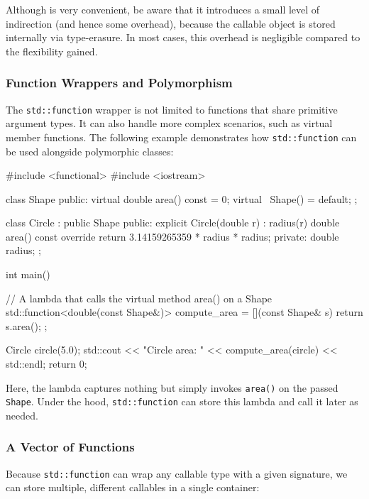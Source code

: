 \begin{warningblock}
Although  is very convenient, be aware that it introduces a small level of indirection (and hence some overhead), because the callable object is stored internally via type-erasure. In most cases, this overhead is negligible compared to the flexibility gained.
\end{warningblock}

\subsubsection{Function Wrappers and Polymorphism}
The \texttt{std::function} wrapper is not limited to functions that share primitive argument types. It can also handle more complex scenarios, such as virtual member functions. The following example demonstrates how \texttt{std::function} can be used alongside polymorphic classes:

\begin{codeblock}[language=C++]
#include <functional>
#include <iostream>

class Shape {
public:
    virtual double area() const = 0;
    virtual ~Shape() = default;
};

class Circle : public Shape {
public:
    explicit Circle(double r) : radius(r) {}
    double area() const override {
        return 3.14159265359 * radius * radius;
    }
private:
    double radius;
};
\end{codeblock}
\begin{codeblock}[language=C++]
int main() {
    // A lambda that calls the virtual method area() on a Shape
    std::function<double(const Shape&)> compute_area =
        [](const Shape& s){ return s.area(); };

    Circle circle(5.0);
    std::cout << "Circle area: " << compute_area(circle) << std::endl;
    return 0;
}
\end{codeblock}

Here, the lambda captures nothing but simply invokes \texttt{area()} on the passed \texttt{Shape}. Under the hood, \texttt{std::function} can store this lambda and call it later as needed.

\subsubsection{A Vector of Functions}
Because \texttt{std::function} can wrap any callable type with a given signature, we can store multiple, different callables in a single container:

